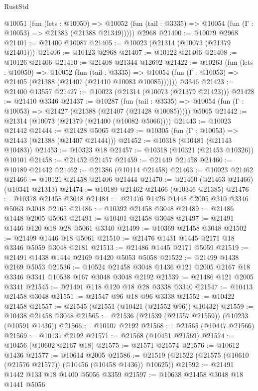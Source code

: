 \begin{lexlean}{RustStd}
\begin{coremodule}
    @10051
      (fun (lets : @10050) =>
      @10052 (fun (tail : @3335) => @10054 (fun (Γ : @10053) => @21383 (@21388 @21349)))))
    @2968
@21400 := @10079 @2968
@21401 := @21400 @10087
@21405 := @10023 (@21314 (@10073 (@21379 @21401)))
@21406 := @10123 @2968
@21407 := @10122 @21406
@21408 := @10126 @21406
@21410 := @21408 @21344 @12692
@21422 := @10263
    (fun (lets : @10050) =>
    @10052
      (fun (tail : @3335) =>
      @10054 (fun (Γ : @10053) => @21405 (@21388 (@21407 (@21410 @10083 @10085))))))
    @3346
@21423 := @21400 @13557
@21427 := @10023 (@21314 (@10073 (@21379 @21423)))
@21428 := @21410 @3346
@21437 := @10287
    (fun (tail : @3335) => @10054 (fun (Γ : @10053) => @21427 (@21388 (@21407 (@21428 @10085)))))
    @5065
@21442 := @21314 (@10073 (@21379 (@21400 (@10082 @5066))))
@21443 := @10023 @21442
@21444 := @21428 @5065
@21449 := @10305 (fun (Γ : @10053) => @21443 (@21388 (@21407 @21444)))
@21452 := @10318 (@10481 (@21143 @10483))
@21453 := @10323 @18
@21457 := @10318 (@10321 (@21453 @10326)) @10101
@21458 := @21452 @21457
@21459 := @21449 @21458
@21460 := @10189 @21442
@21462 := @21386 (@10114 @21458)
@21463 := @10023 @21462
@21466 := @10121 @21458 @21406 @21444
@21470 := @21460 (@21463 @21466) (@10341 @21313)
@21474 := @10189 @21462 @21466 (@10346 @21385)
@21476 := @10378 @21458 @3048
@21484 := @21476 @1426 @1448 @2005 @310 @3346 @5063 @3048 @2165
@21486 := @10392 @21458 @3048
@21489 := @21486 @1448 @2005 @5063
@21491 := @10401 @21458 @3048
@21497 := @21491 @1446 @120 @18 @28 @5061 @3340
@21499 := @10369 @21458 @3048
@21502 := @21499 @1446 @18 @5061
@21510 := @21476 @1431 @1445 @2171 @18 @3346 @5059 @3048 @2181
@21513 := @21486 @1445 @2171 @5059
@21519 := @21491 @1438 @1444 @2169 @1420 @5053 @5058
@21522 := @21499 @1438 @2169 @5053
@21536 := @10524 @21458 @3048 @1436 @121 @2005 @2167 @18 @3346 @3341 @10538 @167 @3048 @3048 @2192
@21539 := @21486 @121 @2005 @3341
@21545 := @21491 @118 @120 @18 @28 @3338 @3340
@21547 := @10413 @21458 @3048
@21551 := @21547 @96 @18 @96 @3338
@21552 := @10422 @21458
@21557 := @21545 (@21551 (@10421 (@21552 @96)) @10432)
@21559 := @10438 @21458 @3048
@21565 := @21536 (@21539 (@21557 @21559)) (@10233 (@10591 @1436))
@21566 := @10107 @2192
@21568 := @21565 (@10447 @21566)
@21569 := @10131 @2192
@21571 := @21568 (@10451 @21569)
@21574 := @10456 (@10602 @2167 @18)
@21575 := @21571 @21574
@21576 := @10612 @1436
@21577 := @10614 @2005
@21586 := @21519 (@21522 (@21575 (@10610 (@21576 @21577)) (@10456 (@10458 @1436)) @10625))
@21592 := @21491 @1442 @133 @18 @1400 @5056 @3359
@21597 := @10638 @21458 @3048 @18 @1441 @5056

\end{coremodule}
\end{lexlean}
